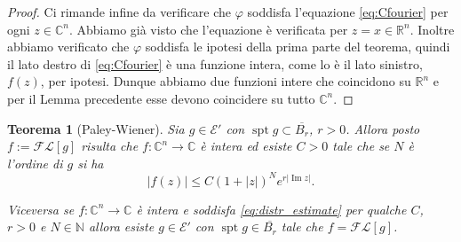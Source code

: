 \documentclass[italian,a4paper,oneside,headinclude]{scrbook}
\renewcommand{\phi}{\varphi}
\newcommand{\E}{\mathcal E}
\newcommand{\F}{\mathcal F}
\newcommand{\FL}{\mathcal F\!\mathcal L}
\newcommand{\CC}{\mathbb C}
\newcommand{\NN}{\mathbb N}
\newcommand{\RR}{\mathbb R}
\newcommand{\abs}[1]{{\left|#1\right|}}
\newcommand{\defeq}{:=}
\DeclareMathOperator{\spt}{spt}
\DeclareMathOperator{\Imaginarypart}{Im}
\renewcommand{\Im}{\Imaginarypart}
\newtheorem{theorem}{Teorema}
\begin{document}
\begin{proof}
  Ci rimande infine da verificare che $\phi$ soddisfa l'equazione
  \eqref{eq:Cfourier} per ogni $z\in \CC^n$.
  Abbiamo già visto che l'equazione è verificata per $z=x\in \RR^n$.
  Inoltre abbiamo verificato che $\phi$ soddisfa le ipotesi della
  prima parte del teorema, quindi il lato destro di
  \eqref{eq:Cfourier} è una funzione intera, come lo è il lato
  sinistro, $f(z)$, per ipotesi.
  Dunque
  abbiamo due funzioni intere che coincidono su $\RR^n$ e per il Lemma
  precedente esse devono coincidere su tutto $\CC^n$.
  \end{proof}

\begin{theorem}[Paley-Wiener]\label{th:PW_dist}
  Sia $g\in \E'$ con $\spt g \subset \overline{B_r}$, $r>0$.
  Allora posto $f \defeq \FL[g]$
  risulta che $f\colon \CC^n\to \CC$ è intera ed esiste $C>0$ tale che
  se $N$ è l'ordine di $g$ si ha
  \begin{equation}\label{eq:distr_estimate}
  \abs{f(z)} \le C (1+\abs{z})^N e^{r\abs{\Im z}}.
  \end{equation}

  Viceversa se $f\colon \CC^n\to \CC$ è intera e soddisfa
  \eqref{eq:distr_estimate} per qualche $C$, $r>0$ e $N\in \NN$ allora esiste
  $g\in\E'$ con $\spt g\in \overline{B_r}$ tale che $f = \FL[g]$.
\end{theorem}
%
\end{document}

